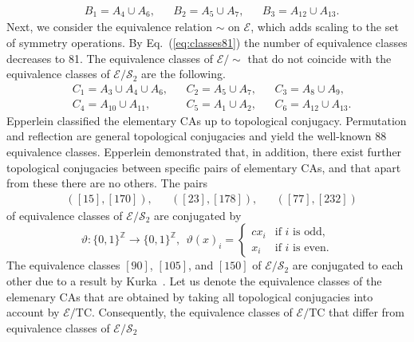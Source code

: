\documentclass[a4paper]{article}
\begin{document}
\begin{align*}
& B_1 = A_4 \cup A_6, & & B_2 = A_5 \cup A_7, & & B_3 = A_{12} \cup A_{13}.
\end{align*}
Next, we consider the equivalence relation $\sim$ on $\mathcal{E}$, which adds scaling to the set of
symmetry operations.
By Eq.~(\ref{eq:classes81}) the number of equivalence classes decreases to 81.
The equivalence classes of $\mathcal{E} / {\sim}$ that do not coincide with the equivalence classes of
$\mathcal{E} / \mathcal{S}_2$ are the following.
\begin{align*}
& C_1 = A_3 \cup A_4 \cup A_6, & & C_2=A_5 \cup A_7, & & C_3=A_8 \cup A_9,  \\
& C_4 = A_{10} \cup A_{11}, & & C_5 = A_1 \cup A_2, & & C_6 = A_{12} \cup A_{13}.
\end{align*}
Epperlein \cite{epperlein2015classification, epperlein2017}
classified the elementary CAs up to topological conjugacy.
Permutation and reflection are general topological conjugacies and yield
the well-known 88 equivalence classes.
Epperlein demonstrated that, in addition, there exist further topological conjugacies between
specific pairs of elementary CAs, and that apart from these there are no others.
The pairs
\begin{align*}
& ([15], [170]), & & ([23], [178]), & & ([77],[232])
\end{align*}
of equivalence classes of $\mathcal{E} / \mathcal{S}_2$ are conjugated
by
\[
\vartheta: \{0,1\}^\mathbb{Z} \to \{0,1\}^\mathbb{Z},  \ \
\vartheta(x)_i =
\begin{cases}
cx_i & \text{if $i$ is odd,} \\
x_i & \text{if $i$ is even.}
\end{cases}
\]
The equivalence classes $[90]$, $[105]$, and $[150]$ of $\mathcal{E} / \mathcal{S}_2$ are
conjugated to each other due to a result by Kurka~\cite{Kurka2003TopologicalAS}.
Let us denote the equivalence classes of the elemenary CAs that are obtained by taking
all topological conjugacies into account by $\mathcal{E} / \mathrm{TC}$.
Consequently, the equivalence classes of $\mathcal{E} / \mathrm{TC}$ that differ from equivalence classes of $\mathcal{E}/ \mathcal{S}_2$
\end{document}
